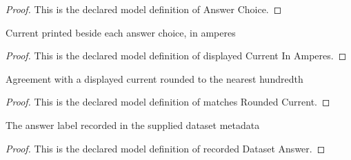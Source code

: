 \begin{proof}
  This is the declared model definition of Answer Choice.
\end{proof}
\begin{definition}
  \label{def:physics:phyx-mini-0985:phyxminiproblems-problemphyxmini0985-answerchoice-displayedcurrentinamperes}
  Current printed beside each answer choice, in amperes
\end{definition}
\begin{proof}
  This is the declared model definition of displayed Current In Amperes.
\end{proof}
\begin{definition}
  \label{def:physics:phyx-mini-0985:phyxminiproblems-problemphyxmini0985-answerchoice-matchesroundedcurrent}
  Agreement with a displayed current rounded to the nearest hundredth
\end{definition}
\begin{proof}
  This is the declared model definition of matches Rounded Current.
\end{proof}
\begin{definition}
  \label{def:physics:phyx-mini-0985:phyxminiproblems-problemphyxmini0985-recordeddatasetanswer}
  The answer label recorded in the supplied dataset metadata
\end{definition}
\begin{proof}
  This is the declared model definition of recorded Dataset Answer.
\end{proof}

